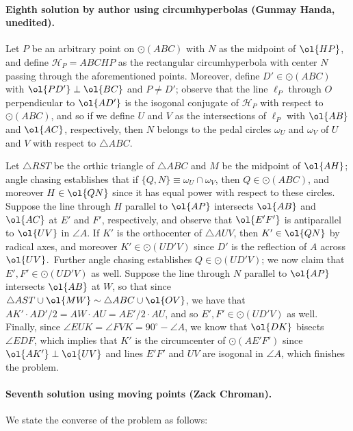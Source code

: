 \paragraph{Eighth solution by author using circumhyperbolas (Gunmay Handa, unedited).}
Let $P$ be an arbitrary point on $\odot(ABC)$
with $N$ as the midpoint of $\ol{HP}$,
and define $\mathcal{H}_P = ABCHP$ as the rectangular circumhyperbola
with center $N$ passing through the aforementioned points.
Moreover, define $D' \in \odot(ABC)$
with $\ol{PD'} \perp \ol{BC}$ and $P \neq D'$;
observe that the line $\ell_P$ through $O$ perpendicular to $\ol{AD'}$
is the isogonal conjugate of $\mathcal{H}_P$ with respect to $\odot(ABC)$,
and so if we define $U$ and $V$ as the intersections of $\ell_P$ with $\ol{AB}$ and $\ol{AC}$, respectively,
then $N$ belongs to the pedal circles $\omega_U$ and $\omega_V$ of $U$ and $V$ with respect to $\triangle ABC$.

Let $\triangle RST$ be the orthic triangle of $\triangle ABC$
and $M$ be the midpoint of $\ol{AH}$;
angle chasing establishes that if $\{Q, N\} \equiv \omega_U \cap \omega_V$,
then $Q \in \odot(ABC)$,
and moreover $H \in \ol{QN}$ since it has equal power with respect to these circles.
Suppose the line through $H$ parallel to $\ol{AP}$ intersects $\ol{AB}$ and $\ol{AC}$ at $E'$ and $F'$, respectively,
and observe that $\ol{E'F'}$ is antiparallel to $\ol{UV}$ in $\angle A$.
If $K'$ is the orthocenter of $\triangle AUV$, then $K' \in \ol{QN}$ by radical axes,
and moreover $K' \in \odot(UD'V)$ since $D'$ is the reflection of $A$ across $\ol{UV}$.\
Further angle chasing establishes $Q \in \odot(UD'V)$; we now claim that $E', F' \in \odot(UD'V)$ as well.
Suppose the line through $N$ parallel to $\ol{AP}$ intersects $\ol{AB}$ at $W$,
so that since $\triangle AST \cup \ol{MW} \sim \triangle ABC \cup \ol{OV}$,
we have that $AK' \cdot AD'/2 = AW \cdot AU = AE'/2 \cdot AU$, and so $E', F' \in \odot(UD'V)$ as well.
Finally, since $\angle EUK = \angle FVK = 90^\circ - \angle A$,
we know that $\ol{DK}$ bisects $\angle EDF$,
which implies that $K'$ is the circumcenter of $\odot(AE'F')$
since $\ol{AK'} \perp \ol{UV}$
and lines $E'F'$ and $UV$ are isogonal in $\angle A$, which finishes the problem.


\paragraph{Seventh solution using moving points (Zack Chroman).}
We state the converse of the problem as follows:

